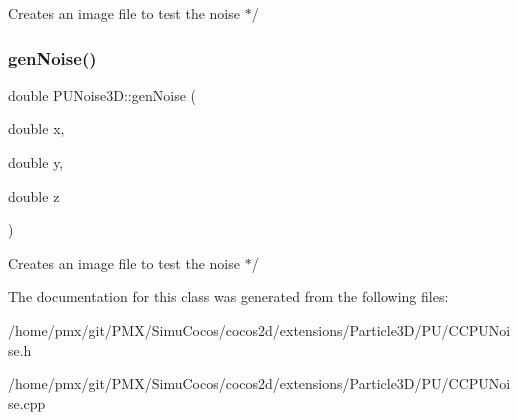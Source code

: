 \begin{DoxyItemize}
\item Creates an image file to test the noise $\ast$/ 
\end{DoxyItemize}\mbox{\label{classPUNoise3D_a16c5a5e589aa77780a872dd460dd9e79}} 
\subsubsection{\texorpdfstring{gen\+Noise()}{genNoise()}\hspace{0.1cm}{\footnotesize\ttfamily [2/2]}}
{\footnotesize\ttfamily double P\+U\+Noise3\+D\+::gen\+Noise (\begin{DoxyParamCaption}\item[{double}]{x,  }\item[{double}]{y,  }\item[{double}]{z }\end{DoxyParamCaption})\hspace{0.3cm}{\ttfamily [protected]}}


\begin{DoxyItemize}
\item Creates an image file to test the noise $\ast$/ 
\end{DoxyItemize}

The documentation for this class was generated from the following files\+:\begin{DoxyCompactItemize}
\item 
/home/pmx/git/\+P\+M\+X/\+Simu\+Cocos/cocos2d/extensions/\+Particle3\+D/\+P\+U/C\+C\+P\+U\+Noise.\+h\item 
/home/pmx/git/\+P\+M\+X/\+Simu\+Cocos/cocos2d/extensions/\+Particle3\+D/\+P\+U/C\+C\+P\+U\+Noise.\+cpp\end{DoxyCompactItemize}
